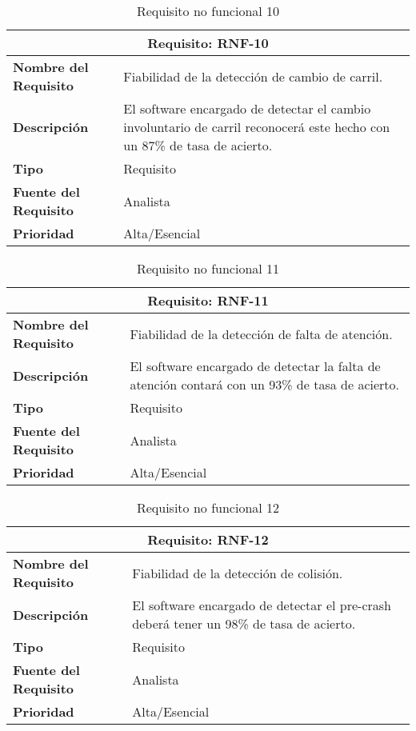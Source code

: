 \begin{table}[H]
\begin{center}
\begin{tabular}{p{} p{7cm}}
\multicolumn{2}{c}{\textbf{Requisito: RNF-10} } \\
\hline \hline
\textbf{Nombre del Requisito} & Fiabilidad de la detección de cambio de carril.\\
\hline
\textbf{Descripción} &  El software encargado de detectar el cambio involuntario de carril reconocerá este hecho con un 87\% de tasa de acierto.\\
\hline
\textbf{Tipo} & Requisito  \\
\hline
\textbf{Fuente del Requisito} & Analista  \\
\hline
\textbf{Prioridad} & Alta/Esencial \\ \hline
\end{tabular}
\caption{Requisito no funcional 10}
\label{tab:RNF-10}
\end{center}
\end{table}

\begin{table}[H]
\begin{center}
\begin{tabular}{p{} p{7cm}}
\multicolumn{2}{c}{\textbf{Requisito: RNF-11} } \\
\hline \hline
\textbf{Nombre del Requisito} & Fiabilidad de la detección de falta de atención.\\
\hline
\textbf{Descripción} &  El software encargado de detectar la falta de atención contará con un 93\% de tasa de acierto.\\
\hline
\textbf{Tipo} & Requisito  \\
\hline
\textbf{Fuente del Requisito} & Analista  \\
\hline
\textbf{Prioridad} & Alta/Esencial \\ \hline
\end{tabular}
\caption{Requisito no funcional 11}
\label{tab:RNF-11}
\end{center}
\end{table}

\begin{table}[H]
\begin{center}
\begin{tabular}{p{} p{7cm}}
\multicolumn{2}{c}{\textbf{Requisito: RNF-12} } \\
\hline \hline
\textbf{Nombre del Requisito} & Fiabilidad de la detección de colisión.\\
\hline
\textbf{Descripción} & El software encargado de detectar el pre-crash deberá tener un 98\% de tasa de acierto.\\
\hline
\textbf{Tipo} & Requisito  \\
\hline
\textbf{Fuente del Requisito} & Analista  \\
\hline
\textbf{Prioridad} & Alta/Esencial \\ \hline
\end{tabular}
\caption{Requisito no funcional 12}
\label{tab:RNF-12}
\end{center}
\end{table}


